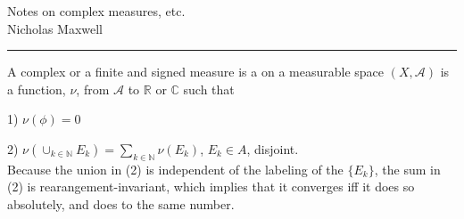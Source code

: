 \documentclass[12pt]{article}
\newcommand{\nats}[0] { \mathbb{N}}
\newcommand{\reals}[0] { \mathbb{R}}
\newcommand{\cmplxs}[0] { \mathbb{C}}
\newcommand{\A}[0] { \mathcal{A} }
\begin{document}
\begin{flushleft}
Notes on complex measures, etc. \\
Nicholas Maxwell\\
\end{flushleft}

\begin{flushleft}
\addvspace{5pt} \hrule
\end{flushleft}	


A complex or a finite and signed measure is a on a measurable space $(X,\A)$ is a function, $\nu$, from $\A$ to $\reals$ or $\cmplxs$ such that

1) $\nu(\phi) = 0$

2) $\nu( \cup_{k\in \nats} E_k ) = \sum_{k \in \nats} \nu(E_k) $, $E_k \in A$, disjoint.  \\

Because the union in (2) is independent of the labeling of the $\{ E_k \}$, the sum in (2) is rearangement-invariant, which implies that it converges iff it does so absolutely, and does to the same number.
\end{document}
